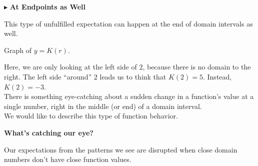 \documentclass{ximera}
\begin{document}
$\blacktriangleright$ \textbf{At Endpoints as Well}

This type of unfulfilled expectation can happen at the end of domain intervals as well.






Graph of $y = K(r)$.

\begin{image}
\end{image}



Here, we are only looking at the left side of $2$, because there is no domain to the right.  The left side ``around'' $2$ leads us to think that $K(2) = 5$.  Instead, $K(2) = -3$. \\




There is something eye-catching about a sudden change in a function's value at a single number, right in the middle (or end) of a domain interval.\\

We would like to describe this type of function behavior. \\



\begin{idea}  \textbf{\textcolor{purple!85!blue}{What's catching our eye?}}


Our expectations from the patterns we see are disrupted when close domain numbers don't have close function values.


\end{idea}
\end{document}
